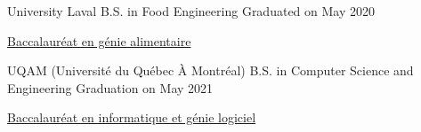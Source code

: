 

\begin{cventries}

  \cventry
    {University Laval} %
    {B.S. in Food Engineering } %
    {Graduated on} %
    {May 2020} %
    {
      \begin{cvitems} %
      \item{\href{https://www.ulaval.ca/les-etudes/programmes/repertoire/details/baccalaureat-en-genie-alimentaire-b-ing.html}
                {Baccalauréat en génie alimentaire}}
      \end{cvitems}
    }

  \cventry
    {UQAM (Université du Québec À Montréal)} %
    {B.S. in Computer Science and Engineering} %
    {Graduation on} %
    {May 2021} %
    {
      \begin{cvitems} %
      \item{\href{https://etudier.uqam.ca/programme?code=7416}
           {Baccalauréat en informatique et génie logiciel}}
      \end{cvitems}
    }

\end{cventries}

